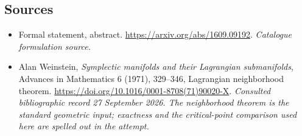 \documentclass[11pt,a4paper]{article}
\numberwithin{equation}{section}
\begin{document}
\subsection{Sources}
\begin{itemize}\raggedright
\item[\textnormal{[S1]}]\hypertarget{source:30006772:1}{} Formal statement, abstract.
\url{https://arxiv.org/abs/1609.09192}.
{\small\textit{Catalogue formulation source.}}
\item[\textnormal{[E1]}]\hypertarget{extra:30006772:1}{} Alan Weinstein,
\emph{Symplectic manifolds and their Lagrangian submanifolds},
Advances in Mathematics 6 (1971), 329--346, Lagrangian neighborhood theorem.
\url{https://doi.org/10.1016/0001-8708(71)90020-X}.
{\small\textit{Consulted bibliographic record 27 September 2026. The
neighborhood theorem is the standard geometric input; exactness and the
critical-point comparison used here are spelled out in the attempt.}}
\end{itemize}
\end{document}

